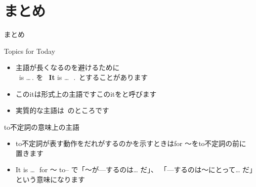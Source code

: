 \documentclass[aspectratio=169,xcolor={dvipsnames,table}]{beamer}
\begin{document}
\section{まとめ}
\begin{frame}[plain]{まとめ}
 \begin{block}{Topics for Today}\small
\begin{itemize}[square]
 \item 主語が長くなるのを避けるために\\
\mbox{}\,\,\,is\,\,\ldots\,. を\,\,\,
{\bfseries It} is \ldots\,\,\,{\setlength{\fboxrule}{1pt}}\,.\,
とすることがあります
 \item このitは形式上の主語です\hfill{\scriptsize このitをと呼びます}
 \item 実質的な主語は\,{\setlength{\fboxrule}{1pt}} のところです
\end{itemize}
\end{block}

\begin{block}{to不定詞の意味上の主語}\small
\begin{itemize}[square]
 \item to不定詞が表す動作をだれがするのかを示すときはfor ～をto不定詞の前に置きます
 \item It is \ldots\,\, for ～ to--\,\,で「～が---するのは\ldots\,\,だ」、
「---するのは～にとって\ldots\,\,だ」という意味になります
\end{itemize}
\end{block}
\end{frame}
\end{document}
